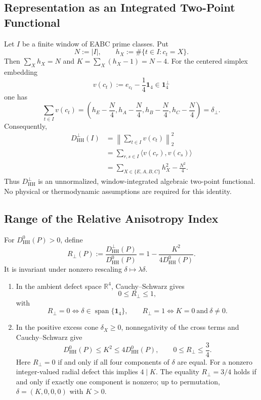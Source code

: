 \documentclass[11pt,a4paper]{article}
\begin{document}
\subsection{Representation as an Integrated Two-Point Functional}

Let $I$ be a finite window of EABC prime classes. Put
\[
N:=|I|,
\qquad
h_X:=\#\{t\in I:c_t=X\}.
\]
Then $\sum_Xh_X=N$ and $K=\sum_X(h_X-1)=N-4$. For the centered
simplex embedding
\[
v(c_t):=e_{c_t}-\frac14\mathbf 1_4\in\mathbf 1_4^\perp
\]
one has
\[
\sum_{t\in I}v(c_t)
=\left(h_E-\frac N4,h_A-\frac N4,h_B-\frac N4,h_C-\frac N4\right)
=\delta_\perp.
\]
Consequently,
\[
\boxed{
\begin{aligned}
D_{\mathrm{HH}}^\perp(I)
&=\left\|\sum_{t\in I}v(c_t)\right\|_2^2\\
&=\sum_{r,s\in I}\langle v(c_r),v(c_s)\rangle\\
&=\sum_{X\in\{E,A,B,C\}}h_X^2-\frac{N^2}{4}.
\end{aligned}}
\]
Thus $D_{\mathrm{HH}}^\perp$ is an unnormalized, window-integrated
algebraic two-point functional. No physical or thermodynamic assumptions are
required for this identity.

\subsection{Range of the Relative Anisotropy Index}

For $D_{\mathrm{HH}}^0(P)>0$, define
\[
R_\perp(P)
:=\frac{D_{\mathrm{HH}}^\perp(P)}{D_{\mathrm{HH}}^0(P)}
=1-\frac{K^2}{4D_{\mathrm{HH}}^0(P)}.
\]
It is invariant under nonzero rescaling $\delta\mapsto\lambda\delta$.

\begin{enumerate}
\item In the ambient defect space $\mathbb R^4$, Cauchy--Schwarz gives
\[
0\le R_\perp\le1,
\]
with
\[
R_\perp=0\iff\delta\in\operatorname{span}\{\mathbf 1_4\},
\qquad
R_\perp=1\iff K=0\ \text{and}\ \delta\ne0.
\]

\item In the positive excess cone $\delta_X\ge0$, nonnegativity of the
cross terms and Cauchy--Schwarz give
\[
D_{\mathrm{HH}}^0(P)\le K^2\le4D_{\mathrm{HH}}^0(P),
\qquad
\boxed{0\le R_\perp\le\frac34}.
\]
Here $R_\perp=0$ if and only if all four components of $\delta$ are
equal. For a nonzero integer-valued radial defect this implies $4\mid K$.
The equality $R_\perp=3/4$ holds if and only if exactly one component is
nonzero; up to permutation, $\delta=(K,0,0,0)$ with $K>0$.
\end{enumerate}
\end{document}
